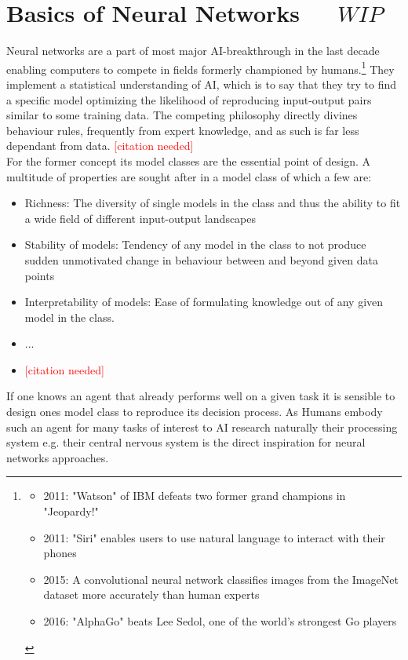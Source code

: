 \section{Basics of Neural Networks\ \ \  \(WIP\)}
Neural networks are a part of most major AI-breakthrough in the last decade enabling computers to compete in fields formerly championed by humans.\footnote[1]{
	\begin{itemize}
		\item 
			2011: "Watson" of IBM defeats two former grand champions in "Jeopardy!" \cite{lally2011natural}
		\item 
			2011: "Siri" enables users to use natural language to interact with their phones 
			\cite{ARON201124}
		\item 
			2015: A convolutional neural network classifies images from the ImageNet dataset more accurately than human experts 
			\cite{Russakovsky2015} \cite{He_2015_ICCV}
		\item 
			2016: "AlphaGo" beats Lee Sedol, one of the world's strongest Go players
			\cite{gibney2016google} \cite{silver2017mastering}
	\end{itemize}
}
They implement a statistical understanding of AI, which is to say that they try to find a specific model optimizing the likelihood of reproducing input-output pairs similar to some training data. The competing philosophy directly divines behaviour rules, frequently from expert knowledge, and as such is far less dependant from data.  
\textcolor{red}{[citation needed]}\\
For the former concept its model classes are the essential point of design. A multitude of properties are sought after in a model class of which a few are:
\begin{itemize}
	\item Richness: The diversity of single models in the class and thus the ability to fit a wide field of different input-output landscapes
	\item Stability of models: Tendency of any model in the class to not produce sudden unmotivated change in behaviour between and beyond given data points
	\item Interpretability of models: Ease of formulating knowledge out of any given model in the class.
	\item ...
	\item \textcolor{red}{[citation needed]}
\end{itemize}
If one knows an agent that already performs well on a given task it is sensible to design ones model class to reproduce its decision process. As Humans embody such an agent for many tasks of interest to AI research naturally their processing system e.g. their central nervous system is the direct inspiration for neural networks approaches.\\
